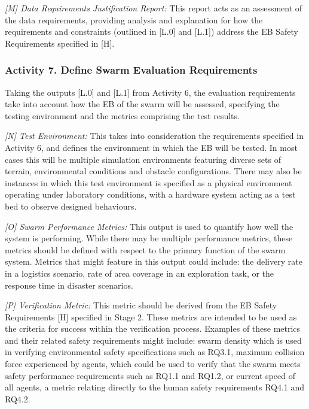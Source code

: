 \documentclass[runningheads]{llncs}
\begin{document}
\emph{[M] Data Requirements Justification Report:}
This report acts as an assessment of the data requirements, providing analysis and explanation for how the requirements and constraints (outlined in [L.0] and [L.1]) address the EB Safety Requirements specified in [H].

\vspace{-2ex}
\subsubsection*{Activity 7. Define Swarm Evaluation Requirements}

Taking the outputs [L.0] and [L.1] from Activity 6, the evaluation requirements take into account how the EB of the swarm will be assessed, specifying the testing environment and the metrics comprising the test results.  

\emph{[N] Test Environment:} This takes into consideration the requirements specified in Activity 6, and defines the environment in which the EB will be tested. In most cases this will be multiple simulation environments featuring diverse sets of terrain, environmental conditions and obstacle configurations. There may also be instances in which this test environment is specified as a physical environment operating under laboratory conditions, with a hardware system acting as a test bed to observe designed behaviours.

\emph{[O] Swarm Performance Metrics:} This output is used to quantify how well the system is performing. While there may be multiple performance metrics, these metrics should be defined with respect to the primary function of the swarm system. Metrics that might feature in this output could include: the delivery rate in a logistics scenario, rate of area coverage in an exploration task, or the response time in disaster scenarios.

\emph{[P] Verification Metric:} This metric should be derived from the EB Safety Requirements [H] specified in Stage 2. These metrics are intended to be used as the criteria for success within the verification process. Examples of these metrics and their related safety requirements might include: swarm density which is used in verifying environmental safety specifications such as RQ3.1, maximum collision force experienced by agents, which could be used to verify that the swarm meets safety performance requirements such as RQ1.1 and RQ1.2, or current speed of all agents, a metric relating directly to the human safety requirements RQ4.1 and RQ4.2.
\end{document}
